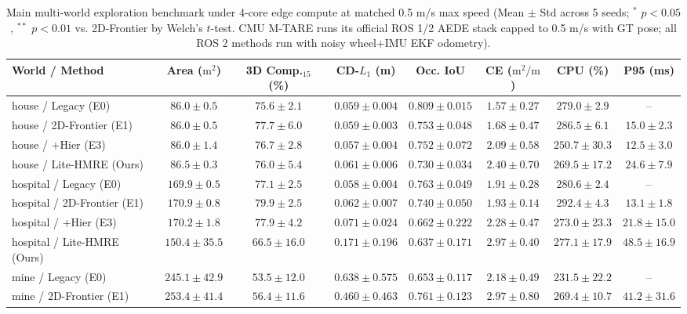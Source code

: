 \begin{table}[t]
\centering
\caption{Main multi-world exploration benchmark under 4-core edge compute at matched 0.5 m/s max speed (Mean $\pm$ Std across 5 seeds; $^*$ $p<0.05$, $^{**}$ $p<0.01$ vs. 2D-Frontier by Welch's $t$-test. CMU M-TARE runs its official ROS 1/2 AEDE stack capped to 0.5 m/s with GT pose; all ROS 2 methods run with noisy wheel+IMU EKF odometry).}
\label{tab:main_results}
\footnotesize
\begin{tabular}{lccccccc}
\toprule
World / Method & Area ($\text{m}^2$) & 3D Comp.$_{15}$ (\%) & CD-$L_1$ (m) & Occ. IoU & CE ($\text{m}^2/\text{m}$) & CPU (\%) & P95 (ms) \\
\midrule
house / Legacy (E0) & $86.0 \pm 0.5$ & $75.6 \pm 2.1$ & $0.059 \pm 0.004$ & $\mathbf{0.809 \pm 0.015}$ & $1.57 \pm 0.27$ & $279.0 \pm 2.9$ & -- \\
house / 2D-Frontier (E1) & $86.0 \pm 0.5$ & $\mathbf{77.7 \pm 6.0}$ & $0.059 \pm 0.003$ & $0.753 \pm 0.048$ & $1.68 \pm 0.47$ & $286.5 \pm 6.1$ & $15.0 \pm 2.3$ \\
house / +Hier (E3) & $86.0 \pm 1.4$ & $76.7 \pm 2.8$ & $\mathbf{0.057 \pm 0.004}$ & $0.752 \pm 0.072$ & $2.09 \pm 0.58$ & $\mathbf{250.7 \pm 30.3}$ & $\mathbf{12.5 \pm 3.0}$ \\
house / Lite-HMRE (Ours) & $\mathbf{86.5 \pm 0.3}$ & $76.0 \pm 5.4$ & $0.061 \pm 0.006$ & $0.730 \pm 0.034$ & $\mathbf{2.40 \pm 0.70}$ & $269.5 \pm 17.2$ & $24.6 \pm 7.9$ \\
\midrule
hospital / Legacy (E0) & $169.9 \pm 0.5$ & $77.1 \pm 2.5$ & $\mathbf{0.058 \pm 0.004}$ & $\mathbf{0.763 \pm 0.049}$ & $1.91 \pm 0.28$ & $280.6 \pm 2.4$ & -- \\
hospital / 2D-Frontier (E1) & $\mathbf{170.9 \pm 0.8}$ & $\mathbf{79.9 \pm 2.5}$ & $0.062 \pm 0.007$ & $0.740 \pm 0.050$ & $1.93 \pm 0.14$ & $292.4 \pm 4.3$ & $\mathbf{13.1 \pm 1.8}$ \\
hospital / +Hier (E3) & $170.2 \pm 1.8$ & $77.9 \pm 4.2$ & $0.071 \pm 0.024$ & $0.662 \pm 0.222$ & $2.28 \pm 0.47$ & $\mathbf{273.0 \pm 23.3}$ & $21.8 \pm 15.0$ \\
hospital / Lite-HMRE (Ours) & $150.4 \pm 35.5$ & $66.5 \pm 16.0$ & $0.171 \pm 0.196$ & $0.637 \pm 0.171$ & $\mathbf{2.97 \pm 0.40}$ & $277.1 \pm 17.9$ & $48.5 \pm 16.9$ \\
\midrule
mine / Legacy (E0) & $245.1 \pm 42.9$ & $53.5 \pm 12.0$ & $0.638 \pm 0.575$ & $0.653 \pm 0.117$ & $2.18 \pm 0.49$ & $\mathbf{231.5 \pm 22.2}$ & -- \\
mine / 2D-Frontier (E1) & $253.4 \pm 41.4$ & $56.4 \pm 11.6$ & $0.460 \pm 0.463$ & $0.761 \pm 0.123$ & $\mathbf{2.97 \pm 0.80}$ & $269.4 \pm 10.7$ & $\mathbf{41.2 \pm 31.6}$ \\

\end{tabular}
\end{table}
